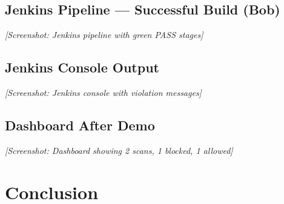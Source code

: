 \subsection{Jenkins Pipeline — Successful Build (Bob)}


\textit{[Screenshot: Jenkins pipeline with green PASS stages]}

\subsection{Jenkins Console Output}


\textit{[Screenshot: Jenkins console with violation messages]}

\subsection{Dashboard After Demo}


\textit{[Screenshot: Dashboard showing 2 scans, 1 blocked, 1 allowed]}

\section{Conclusion}

